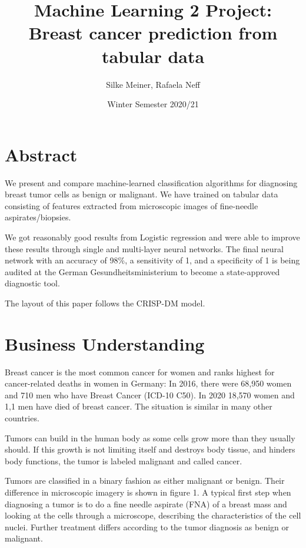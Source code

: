 \documentclass[]{article}
\title{Machine Learning 2 Project: Breast cancer prediction from tabular data}
\author{Silke Meiner, Rafaela Neff}
\date{Winter Semester 2020/21}
\begin{document}
\maketitle

{
\setcounter{tocdepth}{2}
\tableofcontents
}
\section{Abstract}\label{abstract}

We present and compare machine-learned classification algorithms for
diagnosing breast tumor cells as benign or malignant. We have trained on
tabular data consisting of features extracted from microscopic images of
fine-needle aspirates/biopsies.

We got reasonably good results from Logistic regression and were able to
improve these results through single and multi-layer neural networks.
The final neural network with an accuracy of 98\%, a sensitivity of 1,
and a specificity of 1 is being audited at the German
Gesundheitsministerium to become a state-approved diagnostic tool.

The layout of this paper follows the CRISP-DM model.

\section{Business Understanding}\label{business-understanding}

Breast cancer is the most common cancer for women and ranks highest for
cancer-related deaths in women in Germany: In 2016, there were 68,950
women and 710 men who have Breast Cancer (ICD-10 C50). In 2020 18,570
women and 1,1 men have died of breast cancer. The situation is similar
in many other countries.

Tumors can build in the human body as some cells grow more than they
usually should. If this growth is not limiting itself and destroys body
tissue, and hinders body functions, the tumor is labeled malignant and
called cancer.

Tumors are classified in a binary fashion as either malignant or benign.
Their difference in microscopic imagery is shown in figure 1. A typical
first step when diagnosing a tumor is to do a fine needle aspirate (FNA)
of a breast mass and looking at the cells through a microscope,
describing the characteristics of the cell nuclei. Further treatment
differs according to the tumor diagnosis as benign or malignant.
\end{document}

